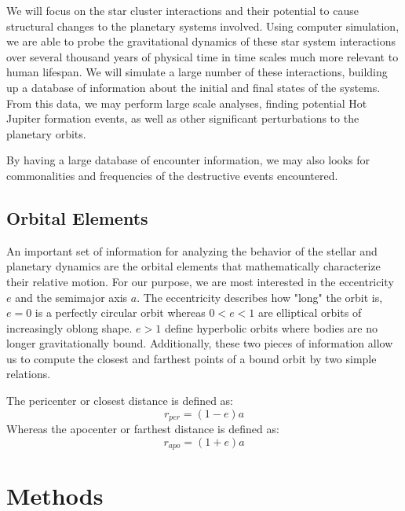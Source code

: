 \documentclass[12pt]{article}
\begin{document}
We will focus on the star cluster interactions and their potential to 
cause structural changes to the planetary systems involved. Using computer simulation,
we are able to probe the gravitational dynamics of these star system 
interactions over several thousand years of physical time 
in time scales much more relevant to human lifespan. We will simulate
a large number of these interactions, building up a database of information about
the initial and final states of the systems. From this data, we may perform large
scale analyses, finding potential Hot Jupiter formation events, as well as other
significant perturbations to the planetary orbits.

By having a large database of encounter information, we may also looks for commonalities
and frequencies of the destructive events encountered. 


\subsection{Orbital Elements}

    An important set of information for analyzing the behavior of the stellar and
    planetary dynamics are the orbital elements that mathematically 
    characterize their relative motion. 
    For our purpose, we are most interested in the eccentricity $e$ and the
    semimajor axis $a$. The eccentricity describes how "long" the orbit is, $e=0$
    is a perfectly circular orbit whereas $0<e<1$ are elliptical orbits of increasingly
    oblong shape. $e>1$ define hyperbolic orbits where bodies are no longer
    gravitationally bound. Additionally, these two pieces of information allow us to 
    compute the closest and farthest points of a bound orbit by two simple relations.

    The pericenter or closest distance is defined as:
    \begin{equation}
        r_{per} = (1 - e) a
    \end{equation}
    Whereas the apocenter or farthest distance is defined as:
    \begin{equation}
        r_{apo} = (1 + e) a
    \end{equation}


\section{Methods}
\end{document}

